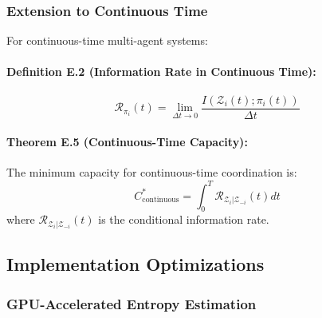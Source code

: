 \documentclass[10pt, letterpaper]{article}
\begin{document}
\subsubsection{Extension to Continuous Time}

For continuous-time multi-agent systems:

\paragraph{Definition E.2 (Information Rate in Continuous Time):}
\[\mathcal{R}_{\pi_i}(t) = \lim_{\Delta t \to 0} \frac{I(\mathcal{Z}_i(t); \pi_i(t))}{\Delta t}\]

\paragraph{Theorem E.5 (Continuous-Time Capacity):} The minimum capacity for continuous-time coordination is:
\[C^*_{\text{continuous}} = \int_0^T \mathcal{R}_{\mathcal{Z}_i | \mathcal{Z}_{-i}}(t) dt\]
where $\mathcal{R}_{\mathcal{Z}_i | \mathcal{Z}_{-i}}(t)$ is the conditional information rate.

\subsection{Implementation Optimizations}

\subsubsection{GPU-Accelerated Entropy Estimation}
\end{document}

